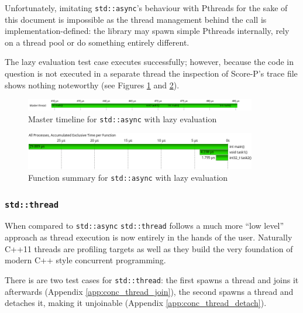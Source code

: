 Unfortunately, imitating \texttt{std::async}'s behaviour with Pthreads for the sake of this document is impossible as the thread management behind the call is implementation-defined: the library may spawn simple Pthreads internally, rely on a thread pool or do something entirely different.

The lazy evaluation test case executes successfully; however, because the code in question is not executed in a separate thread the inspection of Score-P's trace file shows nothing noteworthy (see Figures \ref{scorep:conc_async_lazy_timeline} and \ref{scorep:conc_async_lazy_summary}).

\begin{figure}[htbp]
	\begin{center}
		\includegraphics[width=0.9\textwidth]{img/scorep_async_lazy_timeline.png}
		\caption{Master timeline for \texttt{std::async} with lazy evaluation}
		\label{scorep:conc_async_lazy_timeline}
	\end{center}
\end{figure}

\begin{figure}[htbp]
	\begin{center}
		\includegraphics[width=0.9\textwidth]{img/scorep_async_lazy_summary.png}
		\caption{Function summary for \texttt{std::async} with lazy evaluation}
		\label{scorep:conc_async_lazy_summary}
	\end{center}
\end{figure}

\subsubsection{\texttt{std::thread}}\label{scorep:conc_thread}

When compared to \texttt{std::async} \texttt{std::thread} follows a much more ``low level'' approach as thread execution is now entirely in the hands of the user. Naturally C++11 threads are profiling targets as well as they build the very foundation of modern C++ style concurrent programming.

There is are two test cases for \texttt{std::thread}: the first spawns a thread and joins it afterwards (Appendix \ref{app:conc_thread_join}), the second spawns a thread and detaches it, making it unjoinable (Appendix \ref{app:conc_thread_detach}).

